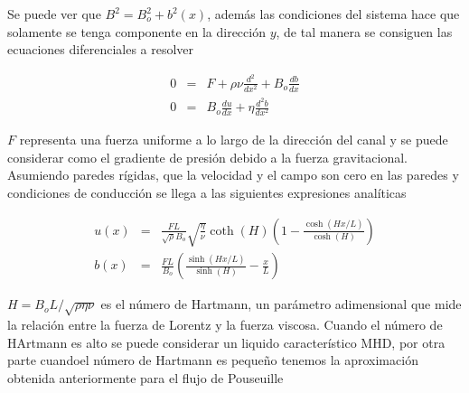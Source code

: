 \noindent Se puede ver que $B^{2} = B_{o}^{2}+b^{2}(x)$, además las condiciones del sistema hace que solamente se tenga componente en la dirección $y$, de tal manera se consiguen las ecuaciones diferenciales a resolver

\begin{eqnarray}
     0 &=& F + \rho\nu\frac{d^{2}}{dx^{2}}+B_{o}\frac{db}{dx}\\
     0&=&B_{o}\frac{du}{dx} + \eta\frac{d^{2}b}{dx^{2}}
\end{eqnarray}

\noindent $F$ representa una fuerza uniforme a lo largo de la dirección del canal y se puede considerar como el gradiente de presión debido a la fuerza gravitacional. Asumiendo paredes rígidas, que la velocidad y el campo son cero en las paredes y condiciones de conducción se llega a las siguientes expresiones analíticas

\begin{eqnarray}
     u(x) &=& \frac{FL}{\sqrt{\rho}B_{o}}\sqrt{\frac{\eta}{\nu}}\coth(H)\left(1-\frac{\cosh(Hx/L)}{\cosh(H)}\right)\\
     b(x) &=& \frac{FL}{B_{o}}\left(\frac{\sinh(Hx/L)}{\sinh(H)}-\frac{x}{L}\right)
\end{eqnarray}

\noindent $H=B_{o}L/\sqrt{\rho\eta\nu}$ es el número de Hartmann, un parámetro adimensional que mide la relación entre la fuerza de Lorentz y la fuerza viscosa. Cuando el número de HArtmann es alto se puede considerar un liquido característico MHD, por otra parte cuandoel número de Hartmann es pequeño tenemos la aproximación obtenida anteriormente para el flujo de Pouseuille 